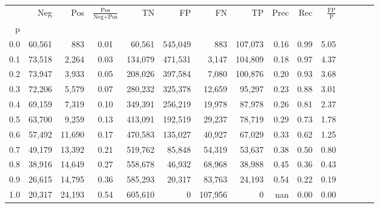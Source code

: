 \begin{tabular}{rrrcrrrrrrrrrrr}
\toprule
{} &     Neg &     Pos & $\frac{\text{Pos}}{\text{Neg}+\text{Pos}}$ &       TN &       FP &       FN &       TP &  Prec &   Rec & $\frac{\text{FP}}{\text{P}}$ \\
p   &         &         &                                            &          &          &          &          &       &       &                              \\
\midrule
0.0 &  60,561 &     883 &                                       0.01 &   60,561 &  545,049 &      883 &  107,073 &  0.16 &  0.99 &                         5.05 \\
0.1 &  73,518 &   2,264 &                                       0.03 &  134,079 &  471,531 &    3,147 &  104,809 &  0.18 &  0.97 &                         4.37 \\
0.2 &  73,947 &   3,933 &                                       0.05 &  208,026 &  397,584 &    7,080 &  100,876 &  0.20 &  0.93 &                         3.68 \\
0.3 &  72,206 &   5,579 &                                       0.07 &  280,232 &  325,378 &   12,659 &   95,297 &  0.23 &  0.88 &                         3.01 \\
0.4 &  69,159 &   7,319 &                                       0.10 &  349,391 &  256,219 &   19,978 &   87,978 &  0.26 &  0.81 &                         2.37 \\
0.5 &  63,700 &   9,259 &                                       0.13 &  413,091 &  192,519 &   29,237 &   78,719 &  0.29 &  0.73 &                         1.78 \\
0.6 &  57,492 &  11,690 &                                       0.17 &  470,583 &  135,027 &   40,927 &   67,029 &  0.33 &  0.62 &                         1.25 \\
0.7 &  49,179 &  13,392 &                                       0.21 &  519,762 &   85,848 &   54,319 &   53,637 &  0.38 &  0.50 &                         0.80 \\
0.8 &  38,916 &  14,649 &                                       0.27 &  558,678 &   46,932 &   68,968 &   38,988 &  0.45 &  0.36 &                         0.43 \\
0.9 &  26,615 &  14,795 &                                       0.36 &  585,293 &   20,317 &   83,763 &   24,193 &  0.54 &  0.22 &                         0.19 \\
1.0 &  20,317 &  24,193 &                                       0.54 &  605,610 &        0 &  107,956 &        0 &   nan &  0.00 &                         0.00 \\
\bottomrule
\end{tabular}
